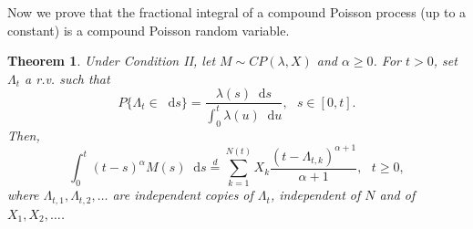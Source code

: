 \documentclass[12pt, twoside, english, headsepline]{article}
\newcommand*\dif{\mathop{}\!\mathrm{d}}  %
\newtheorem{theorem}{Theorem}[section] %
\theoremstyle{definition} %
\numberwithin{equation}{section} %
\begin{document}
Now we prove that the fractional integral of a compound Poisson process (up to a constant) is a compound Poisson random variable.

\begin{theorem}\label{teoremaIntegraleProcessoCompostoPoisson}
Under Condition II, let $M\sim CP(\lambda, X)$ and $\alpha\ge0$. For $t>0$, set $\Lambda_t$ a r.v. such that
\begin{equation}\label{distribuzioneVariabileAleatoriaLambda}
	P\{\Lambda_t\in \dif s\} = \frac{\lambda(s)\dif s}{\int_0^t \lambda(u)\dif u}, \ \ \ s\in[0,t].
\end{equation}
Then,
\begin{equation}\label{integraleProcessoCompostoPoisson}
	\int_0^t (t-s)^\alpha M(s)\dif s \stackrel{d}{=} \sum_{k=1}^{N(t)} X_k\frac{(t-\Lambda_{t,k})^{\alpha+1}}{\alpha+1},\ \ \ t\ge0,
\end{equation}	
where $\Lambda_{t,1}, \Lambda_{t,2},\dots$ are independent copies of $\Lambda_t$, independent of $N$ and of $X_1,X_2,\dots$.
\end{theorem}
\end{document}
